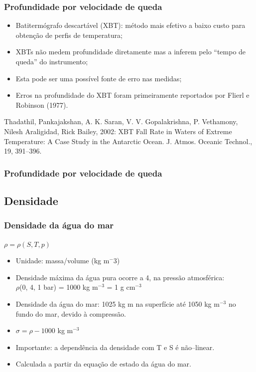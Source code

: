 \begin{frame}
\frametitle{Profundidade por velocidade de queda}
        \small{
        \begin{itemize}[<+-| alert@+>]
            \item Batitermógrafo descartável (XBT): método mais efetivo a baixo
                  custo para obtenção de perfis de temperatura;
            \item XBTs não medem profundidade diretamente mas a inferem pelo
                  ``tempo de queda'' do instrumento;
            \item Esta pode ser uma possível fonte de erro nas medidas;
            \item Erros na profundidade do XBT foram primeiramente reportados
                  por Flierl e Robinson (1977).
        \end{itemize}
        }
    \pause
    \begin{block}{}
    Thadathil, Pankajakshan, A. K. Saran, V. V. Gopalakrishna, P. Vethamony, Nilesh Araligidad, Rick Bailey, 2002: XBT Fall Rate in Waters of Extreme Temperature: A Case Study in the Antarctic Ocean. J. Atmos. Oceanic Technol., 19, 391–396.
    \end{block}
\end{frame}


\begin{frame}
\frametitle{Profundidade por velocidade de queda}
    \begin{center}
    \end{center}
\end{frame}


\subsection{Densidade}
\begin{frame}
\frametitle{Densidade da água do mar}
    \begin{block}{}
    \begin{center}
        $\rho = \rho(S, T, p)$
    \end{center}
    \end{block}
    \pause
    \footnotesize{
    \begin{itemize}[<+-| alert@+>]
    \item Unidade: massa/volume (kg m$^-3$)
    \item Densidade máxima da água pura ocorre a 4\textcelsius, na pressão
          atmosférica:\\
             $\rho$(0, 4\textcelsius, 1 bar) = 1000 kg m$^{-3}$ = 1 g cm$^{-3}$
    \item Densidade da água do mar: 1025 kg m na superfície até 1050 kg m$^{-3}$
          no fundo do mar, devido à compressão.
    \item $\sigma = \rho -1000$ kg m$^{-3}$
    \item Importante: a dependência da densidade com T e S é não--linear.
    \item Calculada a partir da equação de estado da água do mar.
    \end{itemize}
    }
\end{frame}


